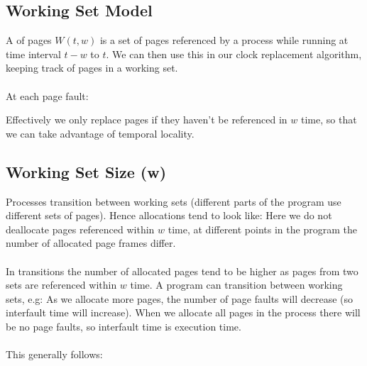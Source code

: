\documentclass{report}
\begin{document}
\subsection*{Working Set Model}
A  of pages $W(t,w)$ is a set of pages referenced by a process while running at time interval $t - w$ to $t$.
We can then use this in our clock replacement algorithm, keeping track of pages in a working set.
\\
\\ At each page fault:
\begin{enumerate}
\end{enumerate}
Effectively we only replace pages if they haven't be referenced in $w$ time, so that we can take advantage of temporal locality.

\subsection*{Working Set Size (w)}
Processes transition between working sets (different parts of the program use different sets of pages). Hence allocations tend to look like:
Here we do not deallocate pages referenced within $w$ time, at different points in the program the number of allocated page frames differ.
\\
\\ In transitions the number of allocated pages tend to be higher as pages from two sets are referenced within $w$ time.
A program can transition between working sets, e.g:
As we allocate more pages, the number of page faults will decrease (so interfault time will increase). When we allocate all pages in the process there will be no page faults, so interfault time is execution time.
\\
\\ This generally follows:
\end{document}

